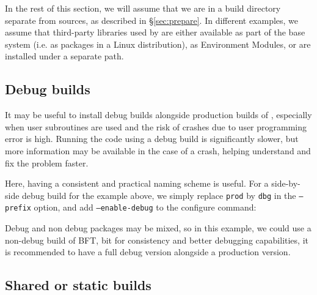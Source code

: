 \documentclass[a4paper,10pt,twoside]{article}
\begin{document}
In the rest of this section, we will assume that we are in
a build directory separate from sources, as described in
\S\ref{sec:prepare}. In different examples, we assume
that third-party libraries used by \CS are either available
as part of the base system (i.e. as packages in a Linux distribution),
as Environment Modules, or are installed under a separate path.

\subsection{Debug builds\label{sec:config:debug}}

It may be useful to install debug builds alongside production
builds of \CS, especially when user subroutines are used
and the risk of crashes due to user programming error is high.
Running the code using a debug build is significantly
slower, but more information may be available in the case
of a crash, helping understand and fix the problem faster.

Here, having a consistent and practical naming scheme is useful.
For a side-by-side debug build for the example above, we simply replace \texttt{prod} by
\texttt{dbg} in the \texttt{--prefix} option, and add
\texttt{--enable-debug} to the configure command:


Debug and non debug packages may be mixed, so in this example,
we could use a non-debug build of BFT, bit for consistency
and better debugging capabilities, it is recommended to have
a full debug version alongside a production version.

\subsection{Shared or static builds\label{sec:config:shared}}
\end{document}
